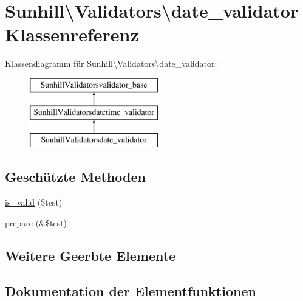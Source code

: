 \hypertarget{classSunhill_1_1Validators_1_1date__validator}{}\section{Sunhill\textbackslash{}Validators\textbackslash{}date\+\_\+validator Klassenreferenz}
\label{classSunhill_1_1Validators_1_1date__validator}
Klassendiagramm für Sunhill\textbackslash{}Validators\textbackslash{}date\+\_\+validator\+:\begin{figure}[H]
\begin{center}
\leavevmode
\includegraphics[height=3.000000cm]{d4/dd0/classSunhill_1_1Validators_1_1date__validator}
\end{center}
\end{figure}
\subsection*{Geschützte Methoden}
\begin{DoxyCompactItemize}
\item 
\hyperlink{classSunhill_1_1Validators_1_1date__validator_af8c6d34d533d63cd8cbced6712f4554e}{is\+\_\+valid} (\$test)
\item 
\hyperlink{classSunhill_1_1Validators_1_1date__validator_a13f2840fbc48e86123cf9057747e4dcd}{prepare} (\&\$test)
\end{DoxyCompactItemize}
\subsection*{Weitere Geerbte Elemente}


\subsection{Dokumentation der Elementfunktionen}
\mbox{\label{classSunhill_1_1Validators_1_1date__validator_af8c6d34d533d63cd8cbced6712f4554e}} 
